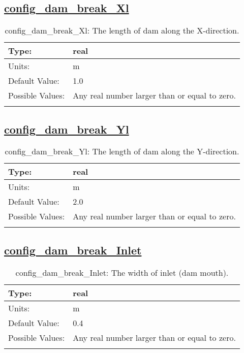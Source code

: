\subsection[config\_dam\_break\_Xl]{\hyperref[sec:nm_tab_dam_break]{config\_dam\_break\_Xl}}
\label{subsec:nm_sec_config_dam_break_Xl}
\begin{center}
\begin{longtable}{| p{2.0in} || p{4.0in} |}
    \hline
    Type: & real \\
    \hline
    Units: & \si{m} \\
    \hline
    Default Value: & 1.0 \\
    \hline
    Possible Values: & Any real number larger than or equal to zero. \\
    \hline
    \caption{config\_dam\_break\_Xl: The length of dam along the X-direction.}
\end{longtable}
\end{center}
\subsection[config\_dam\_break\_Yl]{\hyperref[sec:nm_tab_dam_break]{config\_dam\_break\_Yl}}
\label{subsec:nm_sec_config_dam_break_Yl}
\begin{center}
\begin{longtable}{| p{2.0in} || p{4.0in} |}
    \hline
    Type: & real \\
    \hline
    Units: & \si{m} \\
    \hline
    Default Value: & 2.0 \\
    \hline
    Possible Values: & Any real number larger than or equal to zero. \\
    \hline
    \caption{config\_dam\_break\_Yl: The length of dam along the Y-direction.}
\end{longtable}
\end{center}
\subsection[config\_dam\_break\_Inlet]{\hyperref[sec:nm_tab_dam_break]{config\_dam\_break\_Inlet}}
\label{subsec:nm_sec_config_dam_break_Inlet}
\begin{center}
\begin{longtable}{| p{2.0in} || p{4.0in} |}
    \hline
    Type: & real \\
    \hline
    Units: & \si{m} \\
    \hline
    Default Value: & 0.4 \\
    \hline
    Possible Values: & Any real number larger than or equal to zero. \\
    \hline
    \caption{config\_dam\_break\_Inlet: The width of inlet (dam mouth).}
\end{longtable}
\end{center}
